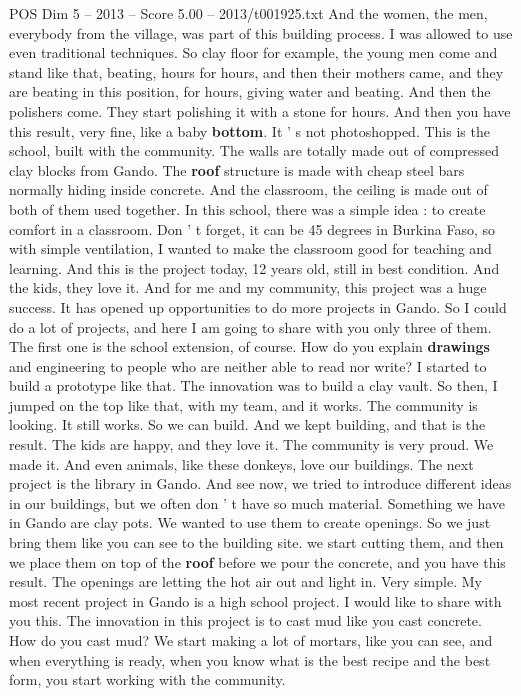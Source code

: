 \begin{textsample}{POS Dim 5 – 2013 – Score 5.00 – 2013/t001925.txt}
And the women, the men, everybody from the village, was part of this building process.
I was allowed to use even traditional techniques.
So clay floor for example, the young men come and stand like that, beating, hours for hours, and then their mothers came, and they are beating in this position, for hours, giving water and beating.
And then the polishers come.
They start polishing it with a stone for hours.
And then you have this result, very fine, like a baby \textbf{bottom}.
It ' s not photoshopped.
This is the school, built with the community.
The walls are totally made out of compressed clay blocks from Gando.
The \textbf{roof} structure is made with cheap steel bars normally hiding inside concrete.
And the classroom, the ceiling is made out of both of them used together.
In this school, there was a simple idea : to create comfort in a classroom.
Don ' t forget, it can be 45 degrees in Burkina Faso, so with simple ventilation, I wanted to make the classroom good for teaching and learning.
And this is the project today, 12 years old, still in best condition.
And the kids, they love it.
And for me and my community, this project was a huge success.
It has opened up opportunities to do more projects in Gando.
So I could do a lot of projects, and here I am going to share with you only three of them.
The first one is the school extension, of course.
How do you explain \textbf{drawings} and engineering to people who are neither able to read nor write?
I started to build a prototype like that.
The innovation was to build a clay vault.
So then, I jumped on the top like that, with my team, and it works.
The community is looking.
It still works.
So we can build.
And we kept building, and that is the result.
The kids are happy, and they love it.
The community is very proud.
We made it.
And even animals, like these donkeys, love our buildings.
The next project is the library in Gando.
And see now, we tried to introduce different ideas in our buildings, but we often don ' t have so much material.
Something we have in Gando are clay pots.
We wanted to use them to create openings.
So we just bring them like you can see to the building site. we start cutting them, and then we place them on top of the \textbf{roof} before we pour the concrete, and you have this result.
The openings are letting the hot air out and light in.
Very simple.
My most recent project in Gando is a high school project.
I would like to share with you this.
The innovation in this project is to cast mud like you cast concrete.
How do you cast mud?
We start making a lot of mortars, like you can see, and when everything is ready, when you know what is the best recipe and the best form, you start working with the community.

\end{textsample}
